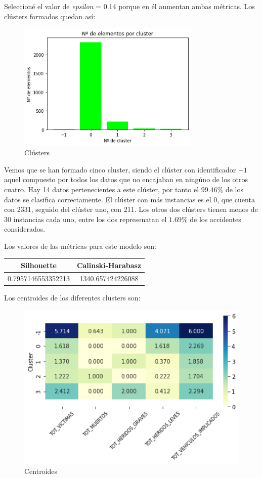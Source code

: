 \documentclass[a4]{article}
\begin{document}
Seleccioné el valor de \textit{epsilon} = 0.14 porque en él aumentan ambas métricas. Los clústers formados quedan así:

\begin{figure}[H]
  \centering
  \caption{Clústers}
  \includegraphics[width=87mm]{imagenes/c3_dbscan_clusters}
\end{figure}

Vemos que se han formado cinco cluster, siendo el clúster con identificador $-1$ aquel compuesto por todos los datos que no encajaban en ningúno de los otros cuatro. Hay 14 datos pertenecientes a este clúster, por tanto el $99.46\%$ de los datos se clasifica correctamente. El clúster con más instancias es el 0, que cuenta con 2331, seguido del clúster uno, con 211. Los otros dos clústers tienen menos de 30 instancias cada uno, entre los dos represenatan el $1.69\%$ de los accidentes considerados.

Los valores de las métricas para este modelo son:

\begin{center}
\begin{tabular}{|c|c|}
\hline
\multicolumn{1}{|c|}{\textbf{Silhouette}} & \textbf{Calinski-Harabasz}\\ \hline
  0.7957146553352213 & 1340.657424226088  \\ \hline
\end{tabular}
\end{center}

Los centroides de los diferentes clusters son:

\begin{figure}[H]
  \centering
  \caption{Centroides}
  \includegraphics[width=130mm]{imagenes/c3_dbscan_centroides}
\end{figure}
\end{document}
